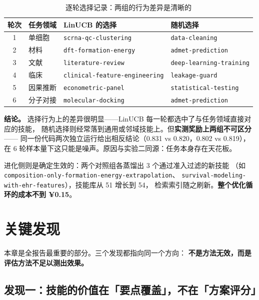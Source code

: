 \documentclass[UTF8, fontset=windows, 11pt, a4paper]{ctexart}
\begin{document}
\begin{table}[h]
\centering
\small
\begin{tabular}{@{}clll@{}}
\toprule
\textbf{轮次} & \textbf{任务领域} & \textbf{LinUCB 的选择} & \textbf{随机选择} \\
\midrule
1 & 单细胞 & \texttt{scrna-qc-clustering} & \texttt{data-cleaning} \\
2 & 材料 & \texttt{dft-formation-energy} & \texttt{admet-prediction} \\
3 & 文献 & \texttt{literature-review} & \texttt{deep-learning-training} \\
4 & 临床 & \texttt{clinical-feature-engineering} & \texttt{leakage-guard} \\
5 & 因果推断 & \texttt{econometric-panel} & \texttt{statistical-testing} \\
6 & 分子对接 & \texttt{molecular-docking} & \texttt{admet-prediction} \\
\bottomrule
\end{tabular}
\caption{逐轮选择记录：两组的行为差异是清晰的}
\end{table}

\textbf{结论。} 选择行为上的差异很明显——LinUCB 每一轮都选中了与任务领域直接对应的技能，
随机选择则经常落到通用或邻域技能上。但\textbf{实测奖励上两组不可区分} ——
同一份代码两次独立运行给出相反结论（0.831 vs 0.820，0.802 vs 0.819），
在 6 轮样本量下这只能是噪声。原因与实验二同源：任务本身存在天花板。

进化侧则是确定生效的：两个对照组各蒸馏出 3 个通过准入过滤的新技能
（如 \texttt{composition-only-formation-energy-extrapolation}、
\texttt{survival-modeling-with-ehr-features}），技能库从 51 增长到 54，
检索索引随之刷新。\textbf{整个优化循环的成本不到 ¥0.15}。

\newpage

\section{关键发现}

本章是全报告最重要的部分。三个发现都指向同一个方向：
\textbf{不是方法无效，而是评估方法不足以测出效果。}

\subsection{发现一：技能的价值在「要点覆盖」，不在「方案评分」}
\end{document}
